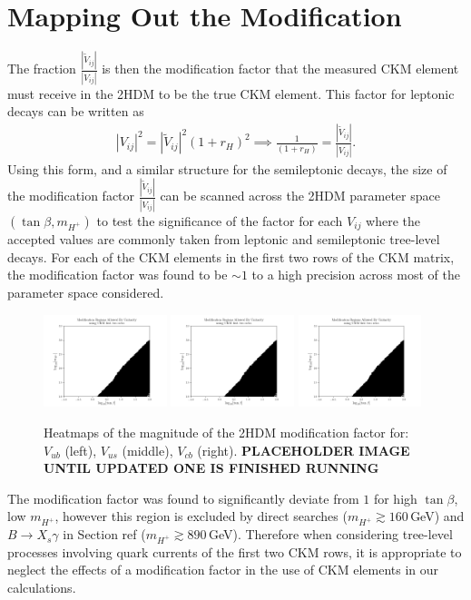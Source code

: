 \documentclass[11pt]{article}
\newcommand{\tVV}{\frac{|\tilde{V}_{ij}|}{|V_{ij}|}}
\begin{document}
\section{Mapping Out the Modification}
The fraction $\tVV$ is then the modification factor that the measured CKM element must receive in the 2HDM to be the true CKM element. 
This factor for leptonic decays can be written as
\begin{align}
    \label{eq:modfac}
    |V_{ij}|^2 = |\tilde{V}_{ij}|^2(1+r_H)^2 \implies \frac{1}{(1+r_H)} = \tVV.
\end{align}
Using this form, and a similar structure for the semileptonic decays, the size of the modification factor $\tVV$ can be scanned across the 2HDM parameter space $(\tan\beta,m_{H^+})$ to test the significance of the factor for each $V_{ij}$ where the accepted values are commonly taken from leptonic and semileptonic tree-level decays. 
For each of the CKM elements in the first two rows of the CKM matrix, the modification factor was found to be $\sim1$ to a high precision across most of the parameter space considered. 
\begin{figure}[H]
    \centering
    \includegraphics[width=0.32\textwidth]{heatmaps/mod.png}
    \includegraphics[width=0.32\textwidth]{heatmaps/mod.png}
    \includegraphics[width=0.32\textwidth]{heatmaps/mod.png}
    \caption{Heatmaps of the magnitude of the 2HDM modification factor for: $V_{ub}$ (left), $V_{us}$ (middle), $V_{cb}$ (right). \textbf{PLACEHOLDER IMAGE UNTIL UPDATED ONE IS FINISHED RUNNING}}
\end{figure}
The modification factor was found to significantly deviate from $1$ for high $\tan\beta$, low $m_{H^+}$, however this region is excluded by direct searches ($m_{H^+}\gtrsim160\,$GeV) and $B\to X_s\gamma$ in Section ref ($m_{H^+}\gtrsim890\,$GeV).
Therefore when considering tree-level processes involving quark currents of the first two CKM rows, it is appropriate to neglect the effects of a modification factor in the use of CKM elements in our calculations. 
\end{document}
